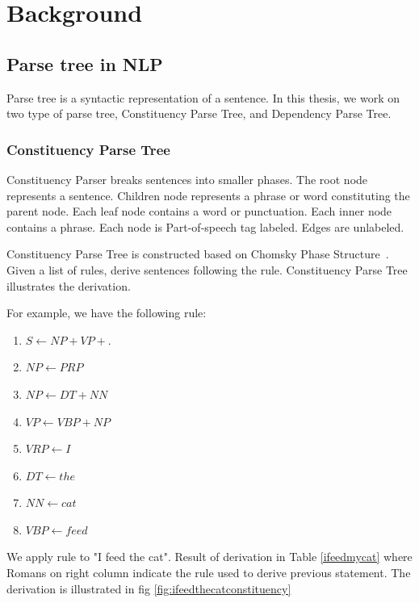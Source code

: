 \hypertarget{chap:background}{\chapter{Background}}\label{chap:background}



\section{Parse tree in NLP}
Parse tree is a syntactic representation of a sentence. In this thesis, we work on two type of parse tree, Constituency Parse Tree, and Dependency Parse Tree.
\subsection{Constituency Parse Tree}
Constituency Parser breaks sentences into smaller phases. The root node represents a sentence. Children node represents a phrase or word constituting the parent node.
Each leaf node contains a word or punctuation. Each inner node contains a phrase. Each node is Part-of-speech tag labeled. Edges are unlabeled.

Constituency Parse Tree is constructed based on Chomsky Phase Structure~\cite{chomsky2002syntactic}. Given a list of rules, derive sentences following the rule. Constituency Parse Tree illustrates the derivation.


For example, we have the following rule:
\begin{enumerate}[label=(\roman*)]
    \item $S \leftarrow NP + VP + .$
    \item $NP \leftarrow PRP $
    \item $NP \leftarrow DT + NN$
    \item $VP \leftarrow VBP + NP$
    \item $VRP \leftarrow I$
    \item $DT \leftarrow the$
    \item $NN \leftarrow cat$
    \item $VBP \leftarrow feed$
\end{enumerate}
We apply rule to "I feed the cat". Result of derivation in Table \ref{ifeedmycat}  where Romans on right column indicate the rule used to derive previous statement. The derivation is illustrated in fig \ref{fig:ifeedthecatconstituency}

